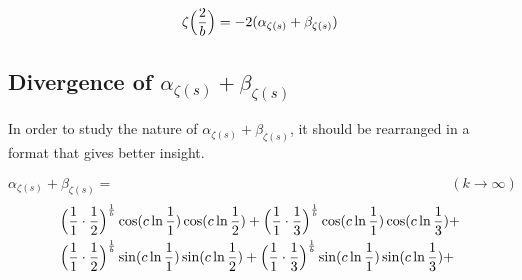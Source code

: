 \documentclass{amsart}
\begin{document}
	\[ \zeta\Bigl( \frac{2}{b} \Bigr) = -2(\alpha_{\zeta(s)} + \beta_{\zeta(s)}) \]
	
	\subsection{Divergence of $\alpha_{\zeta(s)} + \beta_{\zeta(s)}$}
	In order to study the nature of $\alpha_{\zeta(s)} + \beta_{\zeta(s)}$, it should be rearranged in a format that gives better insight.
	
	\[ \alpha_{\zeta(s)} + \beta_{\zeta(s)} = \qquad\qquad\qquad\qquad\qquad\qquad\qquad\qquad\qquad\qquad\qquad\qquad (k \to \infty) \]
	\[
	\begin{aligned}
		& \Bigl( \frac{1}{1} \cdot \frac{1}{2} \Bigr)^\frac1b \cos(c \ln \frac{1}{1}) \cos(c \ln \frac{1}{2}) + \Bigl( \frac{1}{1} \cdot \frac{1}{3} \Bigr)^\frac1b \cos(c \ln \frac{1}{1}) \cos(c \ln \frac{1}{3}) + \\
		& \Bigl( \frac{1}{1} \cdot \frac{1}{2} \Bigr)^\frac1b \sin(c \ln \frac{1}{1}) \sin(c \ln \frac{1}{2}) + \Bigl( \frac{1}{1} \cdot \frac{1}{3} \Bigr)^\frac1b \sin(c \ln \frac{1}{1}) \sin(c \ln \frac{1}{3}) + 
	\end{aligned}
	\]
	
\end{document}
